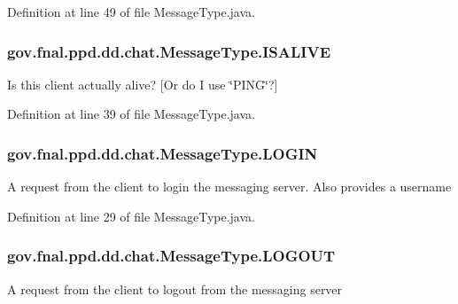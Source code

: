 Definition at line 49 of file Message\-Type.\-java.

\hypertarget{enumgov_1_1fnal_1_1ppd_1_1dd_1_1chat_1_1MessageType_a2ed9c72efc8c9e99324aea4b5ee48b22}{
\subsubsection[{I\-S\-A\-L\-I\-V\-E}]{\setlength{\rightskip}{0pt plus 5cm}gov.\-fnal.\-ppd.\-dd.\-chat.\-Message\-Type.\-I\-S\-A\-L\-I\-V\-E}}\label{enumgov_1_1fnal_1_1ppd_1_1dd_1_1chat_1_1MessageType_a2ed9c72efc8c9e99324aea4b5ee48b22}
Is this client actually alive? \mbox{[}Or do I use \char`\"{}\-P\-I\-N\-G\char`\"{}?\mbox{]} 

Definition at line 39 of file Message\-Type.\-java.

\hypertarget{enumgov_1_1fnal_1_1ppd_1_1dd_1_1chat_1_1MessageType_a8d27be5a9d764efc7aaa4d655bb7a30a}{
\subsubsection[{L\-O\-G\-I\-N}]{\setlength{\rightskip}{0pt plus 5cm}gov.\-fnal.\-ppd.\-dd.\-chat.\-Message\-Type.\-L\-O\-G\-I\-N}}\label{enumgov_1_1fnal_1_1ppd_1_1dd_1_1chat_1_1MessageType_a8d27be5a9d764efc7aaa4d655bb7a30a}
A request from the client to login the messaging server. Also provides a username 

Definition at line 29 of file Message\-Type.\-java.

\hypertarget{enumgov_1_1fnal_1_1ppd_1_1dd_1_1chat_1_1MessageType_aba9c716304ccdd40f9c477bd551c6176}{
\subsubsection[{L\-O\-G\-O\-U\-T}]{\setlength{\rightskip}{0pt plus 5cm}gov.\-fnal.\-ppd.\-dd.\-chat.\-Message\-Type.\-L\-O\-G\-O\-U\-T}}\label{enumgov_1_1fnal_1_1ppd_1_1dd_1_1chat_1_1MessageType_aba9c716304ccdd40f9c477bd551c6176}
A request from the client to logout from the messaging server 

